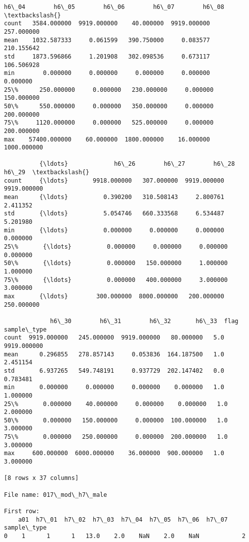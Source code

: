 \documentclass[11pt]{article}
\begin{document}
\begin{Verbatim}[commandchars=\\\{\}]
              h6\_04        h6\_05        h6\_06        h6\_07        h6\_08  \textbackslash{}
count   3584.000000  9919.000000    40.000000  9919.000000   257.000000   
mean    1032.587333     0.061599   390.750000     0.083577   210.155642   
std     1873.596866     1.201908   302.098536     0.673117   106.506928   
min        0.000000     0.000000     0.000000     0.000000     0.000000   
25\%      250.000000     0.000000   230.000000     0.000000   150.000000   
50\%      550.000000     0.000000   350.000000     0.000000   200.000000   
75\%     1120.000000     0.000000   525.000000     0.000000   200.000000   
max    57400.000000    60.000000  1800.000000    16.000000  1000.000000   

          {\ldots}             h6\_26        h6\_27        h6\_28        h6\_29  \textbackslash{}
count     {\ldots}       9918.000000   307.000000  9919.000000  9919.000000   
mean      {\ldots}          0.390200   310.508143     2.800761     2.411352   
std       {\ldots}          5.054746   660.333568     6.534487     5.201980   
min       {\ldots}          0.000000     0.000000     0.000000     0.000000   
25\%       {\ldots}          0.000000     0.000000     0.000000     0.000000   
50\%       {\ldots}          0.000000   150.000000     1.000000     1.000000   
75\%       {\ldots}          0.000000   400.000000     3.000000     3.000000   
max       {\ldots}        300.000000  8000.000000   200.000000   250.000000   

             h6\_30        h6\_31        h6\_32       h6\_33  flag  sample\_type  
count  9919.000000   245.000000  9919.000000   80.000000   5.0  9919.000000  
mean      0.296855   278.857143     0.053836  164.187500   1.0     2.451154  
std       6.937265   549.748191     0.937729  202.147402   0.0     0.783481  
min       0.000000     0.000000     0.000000    0.000000   1.0     1.000000  
25\%       0.000000    40.000000     0.000000    0.000000   1.0     2.000000  
50\%       0.000000   150.000000     0.000000  100.000000   1.0     3.000000  
75\%       0.000000   250.000000     0.000000  200.000000   1.0     3.000000  
max     600.000000  6000.000000    36.000000  900.000000   1.0     3.000000  

[8 rows x 37 columns]

File name: 017\_mod\_h7\_male

First row: 
    a01  h7\_01  h7\_02  h7\_03  h7\_04  h7\_05  h7\_06  h7\_07  sample\_type
0    1      1      1   13.0    2.0    NaN    2.0    NaN            2


\end{Verbatim}
\end{document}
